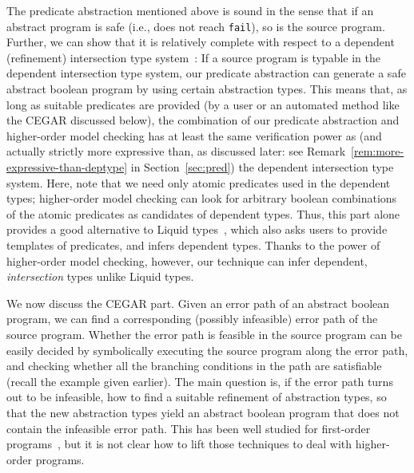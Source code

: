 %
The predicate abstraction mentioned above is sound in the sense that if 
an abstract program is safe (i.e., does not reach \texttt{fail}), so is 
the source program. Further, we can show that it is relatively complete 
with respect to a dependent (refinement) intersection type 
system~\cite{Terauchi2010}: If a source program is typable in the 
dependent intersection type system, our predicate abstraction can 
generate a safe abstract boolean program by using certain abstraction 
types.
This means that, as long as suitable predicates are provided (by a user 
or an automated method like the CEGAR discussed below), the combination 
of our predicate abstraction and higher-order model checking has at 
least the same verification power as (and actually strictly more 
expressive than, as discussed later: see 
Remark~\ref{rem:more-expressive-than-deptype} in Section~\ref{sec:pred}) 
the dependent intersection type system. Here, note that we need only 
atomic predicates used in the dependent types; higher-order model 
checking can look for arbitrary boolean combinations of the atomic 
predicates as candidates of dependent types. Thus, this part alone 
provides a good alternative to Liquid types~\cite{Rondon2008}, which 
also asks users to provide templates of predicates, and infers dependent 
types. Thanks to the power of higher-order model checking, however, our 
technique can infer dependent, \emph{intersection} types unlike Liquid 
types.


We now discuss the CEGAR part. Given an error path of an abstract 
boolean program, we can find a corresponding (possibly infeasible) error 
path of the source program. Whether the error path is feasible in the 
source program can be easily decided by symbolically executing the 
source program along the error path, and checking whether all the 
branching conditions in the path are satisfiable (recall the example 
given earlier). The main question is, if the error path turns out to be 
infeasible, how to find a suitable refinement of abstraction types, so 
that the new abstraction types yield an abstract boolean program that 
does not contain the infeasible error path. This has been well studied 
for first-order 
programs~\cite{Ball2001,Ball2002,Ball2005,Heizmann2010,Clarke2003a,Henzinger2002,Henzinger2004},
%
but it is not clear how to lift those techniques to deal with 
higher-order programs.

